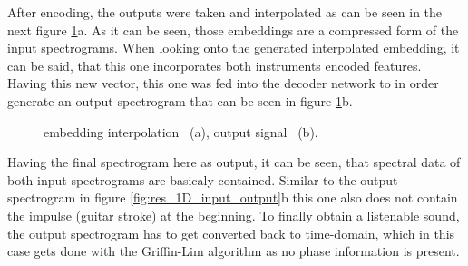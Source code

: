 After encoding, the outputs were taken and interpolated as can be seen in the next figure \ref{fig:res_1D_interpolation}a. As it can be seen, those embeddings are a compressed form of the input spectrograms. When looking onto the generated interpolated embedding, it can be said, that this one incorporates both instruments encoded features. Having this new vector, this one was fed into the decoder network to in order generate an output spectrogram that can be seen in figure \ref{fig:res_1D_interpolation}b. 

\begin{figure}[htb!]
    \centering
    \caption{embedding interpolation ~(a), output signal ~(b).}
    \label{fig:res_1D_interpolation}
\end{figure}

Having the final spectrogram here as output, it can be seen, that spectral data of both input spectrograms are basicaly contained. Similar to the output spectrogram in figure \ref{fig:res_1D_input_output}b this one also does not contain the impulse (guitar stroke) at the beginning. To finally obtain a listenable sound, the output spectrogram has to get converted back to time-domain, which in this case gets done with the Griffin-Lim algorithm \cite{Griffin1984} as no phase information is present. 

